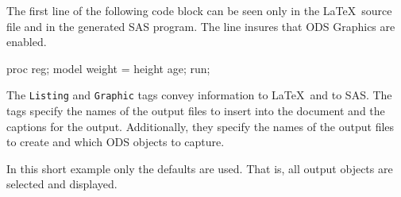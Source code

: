 \documentclass{article}
\begin{document}
  The first line of the following code block can be seen only
  in the \LaTeX\ source file and in the generated SAS program. 
  The line insures that ODS Graphics are enabled.

\begin{Sascode}[store=REGa]
proc reg;
    model weight = height age;
run;
\end{Sascode}

  The \texttt{Listing} and \texttt{Graphic} tags convey information to
  \LaTeX\ and to SAS. The tags specify the names of the output files to
  insert into the document and the captions for the output.
  Additionally, they specify the names of the output files to create
  and which ODS objects to capture.



In this short example only the defaults are used. That is, all output
objects are selected and displayed.

\end{document}
